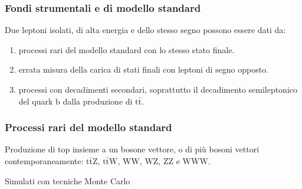\documentclass[italian]{beamer}
\begin{document}
\begin{frame}
    \frametitle{Fondi strumentali e di modello standard}
    Due leptoni isolati, di alta energia e dello stesso segno possono essere dati da:
    \begin{enumerate}
        \item processi rari del modello standard con lo stesso stato finale.
        \item errata misura della carica di stati finali con leptoni di
            segno opposto.
        \item processi con decadimenti secondari, soprattutto il decadimento
            semileptonico del quark $\mathrm{b}$ dalla produzione di
            $\mathrm{t} \bar{\mathrm{t}}$.  
    \end{enumerate}
\end{frame}

\begin{frame}
    \frametitle{Processi rari del modello standard}
    Produzione di top insieme a un bosone vettore, o di pi\`u bosoni vettori
    contemporaneamente:
    $\mathrm{t} \bar{\mathrm{t}}\mathrm{Z}$, $\mathrm{t}
    \bar{\mathrm{t}} \mathrm{W}$,
                    $\mathrm{WW}$, $\mathrm{WZ}$, $\mathrm{ZZ}$ e
                    $\mathrm{WWW}$.

                    \alert{Simulati con tecniche Monte Carlo}
\end{frame}
\end{document}
